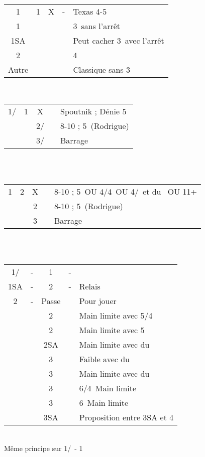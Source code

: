 \documentclass[a4paper, oneside, 11pt]{report}
\begin{document}
		\begin{tabular}{cccc|l}
		1\trefle & 1\coeur & X & - & Texas 4-5\pique\\
		1\pique &&&& 3\pique\ sans l'arrêt\\
		1SA &&&& Peut cacher 3\pique\ avec l'arrêt \coeur\\
		2\pique &&&& 4\pique\\
		Autre &&&& Classique sans 3\pique\\
		\end{tabular}\\
		
		\SSection{Rodrigue}
		\begin{tabular}{cccc|l}
		1\trefle/\carreau & 1\pique & X && Spoutnik ; Dénie 5\coeur\\
		&& 2\trefle/\carreau && 8-10 ; 5\coeur\ (Rodrigue)\\
		&& 3\trefle/\carreau && Barrage\\
		\end{tabular}\\\\

		\begin{tabular}{cccc|l}
		1\carreau & 2\trefle & X && 8-10 ; 5\pique\ OU 4\coeur/4\pique\ OU 4\coeur/\pique\ et du \carreau\ OU 11+\\
		&& 2\carreau && 8-10 ; 5\coeur\ (Rodrigue)\\
		&& 3\carreau && Barrage\\
		\end{tabular}\\\\

\newpage
	\begin{tabular}{cccc|l}
	1\trefle/\carreau & - & 1\pique & - &\\
	1SA & - & 2\trefle & - & Relais\\
	2\carreau & - & Passe && Pour jouer\\
	&& 2\coeur && Main limite avec 5\pique/4\coeur\\
	&& 2\pique && Main limite avec 5\pique\\
	&& 2SA && Main limite avec du \trefle\\
	&& 3\trefle && Faible avec du \trefle\\
	&& 3\carreau && Main limite avec du \carreau\\
	&& 3\coeur && 6\pique/4\coeur\ Main limite\\
	&& 3\pique && 6\pique\ Main limite\\
	&& 3SA && Proposition entre 3SA et 4\pique\\
	\end{tabular}\\
	Même principe sur 1\trefle/\carreau\ - 1\coeur\\
\end{document}
